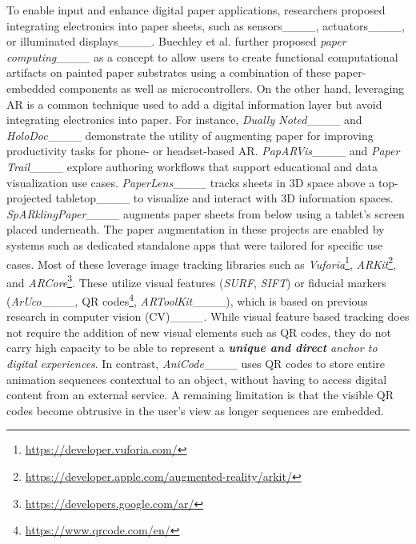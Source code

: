 To enable input and enhance digital paper applications, researchers proposed integrating electronics into paper sheets, such as sensors____, actuators____, or illuminated displays____.
Buechley et al. further proposed \textit{paper computing}____ as a concept to allow users to create functional computational artifacts on painted paper substrates using a combination of these paper-embedded components as well as microcontrollers.
On the other hand, leveraging AR  is a common technique used to add a digital information layer but avoid integrating electronics into paper.
For instance, \textit{Dually Noted}____ and \textit{HoloDoc}____ demonstrate the utility of augmenting paper for improving productivity tasks for phone- or headset-based AR.
\textit{PapARVis}____ and \textit{Paper Trail}____ explore authoring workflows that support educational and data visualization use cases.
\textit{PaperLens}____ tracks sheets in 3D space above a top-projected tabletop____ to visualize and interact with 3D information spaces.
\textit{SpARklingPaper}____ augments paper sheets from below using a tablet’s screen placed underneath.
The paper augmentation in these projects are enabled by systems such as dedicated standalone apps that were tailored for specific use cases. Most of these leverage image tracking libraries such as \textit{Vuforia}\footnote{\url{https://developer.vuforia.com/}}, \textit{ARKit}\footnote{\url{https://developer.apple.com/augmented-reality/arkit/}}, and \textit{ARCore}\footnote{\url{https://developers.google.com/ar/}}. These utilize visual features (\textit{SURF}, \textit{SIFT}) or fiducial markers (\textit{ArUco}____, QR codes\footnote{\url{https://www.qrcode.com/en/}}, \textit{ARToolKit}____),  which is based on previous research in computer vision (CV)____. While visual feature based tracking does not require the addition of new visual elements such as QR codes, they do not carry high capacity to be able to represent a \textit{\textbf{unique and direct} anchor %
to digital experiences}.
In contrast, \textit{AniCode}____ uses QR codes to store entire animation sequences contextual to an object, without having to access digital content from an external service.
A remaining limitation is that %
the visible QR codes become obtrusive in the user's view as longer sequences are embedded.






